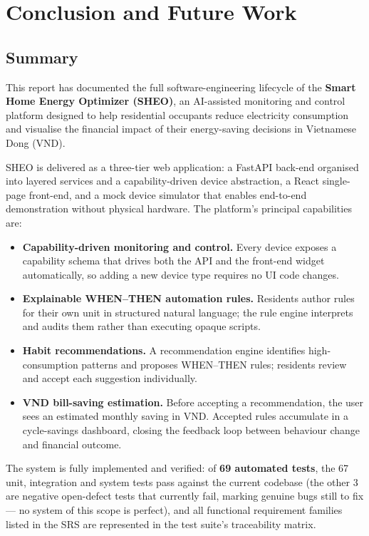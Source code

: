 \chapter{Conclusion and Future Work}

\section{Summary}

This report has documented the full software-engineering lifecycle of the
\textbf{Smart Home Energy Optimizer (SHEO)}, an AI-assisted monitoring and
control platform designed to help residential occupants reduce electricity
consumption and visualise the financial impact of their energy-saving decisions
in Vietnamese Dong (VND).

SHEO is delivered as a three-tier web application: a FastAPI back-end organised
into layered services and a capability-driven device abstraction, a React
single-page front-end, and a mock device simulator that enables end-to-end
demonstration without physical hardware.  The platform's principal capabilities
are:

\begin{itemize}[noitemsep]
  \item \textbf{Capability-driven monitoring and control.} Every device exposes a
        capability schema that drives both the API and the front-end widget
        automatically, so adding a new device type requires no UI code changes.
  \item \textbf{Explainable WHEN--THEN automation rules.} Residents author rules
        for their own unit in structured natural language; the rule
        engine interprets and audits them rather than executing opaque scripts.
  \item \textbf{Habit recommendations.} A recommendation engine identifies
        high-consumption patterns and proposes WHEN--THEN rules; residents review
        and accept each suggestion individually.
  \item \textbf{VND bill-saving estimation.} Before accepting a recommendation,
        the user sees an estimated monthly saving in VND.  Accepted rules
        accumulate in a cycle-savings dashboard, closing the feedback loop between
        behaviour change and financial outcome.
\end{itemize}

The system is fully implemented and verified: of \textbf{69 automated tests}, the 67
unit, integration and system tests pass against the current codebase (the other 3 are
negative open-defect tests that currently fail, marking genuine bugs still to fix ---
no system of this scope is perfect), and all
functional requirement families listed in the SRS are represented in the
test suite's traceability matrix.

